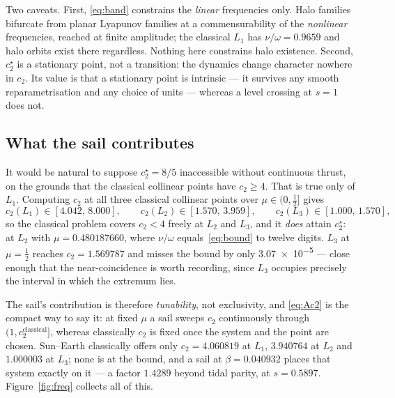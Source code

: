 \documentclass[pdflatex,sn-mathphys-num]{sn-jnl}
\begin{document}
Two caveats. First, \eqref{eq:band} constrains the \emph{linear} frequencies
only. Halo families bifurcate from planar Lyapunov families at a
commensurability of the \emph{nonlinear} frequencies, reached at finite
amplitude; the classical $L_1$ has $\nu/\omega=0.9659$ and halo orbits exist
there regardless. Nothing here constrains halo existence.
Second, $c_2^\star$ is a stationary point, not a transition: the dynamics change
character nowhere in $c_2$. Its value is that a stationary point is intrinsic ---
it survives any smooth reparametrisation and any choice of units --- whereas a
level crossing at $s=1$ does not.

\subsection{What the sail contributes}

It would be natural to suppose $c_2^\star=8/5$ inaccessible without continuous
thrust, on the grounds that the classical collinear points have $c_2\geq4$. That
is true only of $L_1$. Computing $c_2$ at all three classical collinear points
over $\mu\in(0,\tfrac12]$ gives
\begin{equation}
  c_2(L_1)\in[4.042,\,8.000], \qquad
  c_2(L_2)\in[1.570,\,3.959], \qquad
  c_2(L_3)\in[1.000,\,1.570],
\end{equation}
so the classical problem covers $c_2<4$ freely at $L_2$ and $L_3$, and it
\emph{does} attain $c_2^\star$: at $L_2$ with $\mu=0.480187660$, where
$\nu/\omega$ equals~\eqref{eq:bound} to twelve digits. $L_3$ at $\mu=\tfrac12$
reaches $c_2=1.569787$ and misses the bound by only \num{3.07e-5} --- close
enough that the near-coincidence is worth recording, since $L_3$ occupies
precisely the interval in which the extremum lies.

The sail's contribution is therefore \emph{tunability}, not exclusivity, and
\eqref{eq:Ac2} is the compact way to say it: at fixed $\mu$ a sail sweeps $c_2$
continuously through $(1,c_2^{\mathrm{classical}}]$, whereas classically $c_2$
is fixed once the system and the point are chosen. Sun--Earth classically offers
only $c_2=4.060819$ at $L_1$, $3.940764$ at $L_2$ and $1.000003$ at $L_3$; none
is at the bound, and a sail at $\beta=0.040932$ places that system exactly on it
--- a factor $1.4289$ beyond tidal parity, at $s=0.5897$.
Figure~\ref{fig:freq} collects all of this.
\end{document}
